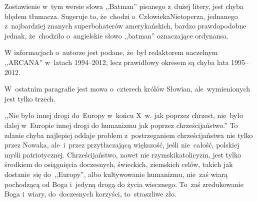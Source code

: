\documentclass[a4paper,11pt]{article}
\begin{document}
\start {} Zostawienie w~tym wersie słowa ,,Batman''
pisanego z~dużej litery, jest chyba błędem tłumacza. Sugeruje to,
że~chodzi o~Człowieka\dywiz Nietoperza, jednanego z~najbardziej
znanych superbohaterów amerykańskich, bardzo prawdopodobne jednak,
że~chodziło o~angielskie słowo ,,batman'' oznaczające ordynansa.


\vspace{\spaceTwo}








\start {} W informacjach o~autorze jest podane,
że~był redaktorem naczelnym ,,ARCANA'' w~latach 1994--2012, lecz
prawidłowy okresem są chyba lata 1995--2012.

\vspace{\spaceFour}


\start {} W~ostatnim paragrafie jest mowa o~czterech królów
Słowian, ale~wymienionych jest tylko trzech.

\vspace{\spaceFour}

\start {} ,,Nie było innej drogi do~Europy w~końcu X~w.
jak poprzez chrzest, nie~było dalej w~Europie innej drogi do humanizmu
jak poprzez chrześcijaństwo.'' To zdanie chyba najlepiej oddaje
problem z~postrzeganiem chrześcijaństwa nie tylko przez Nowaka,
ale~i~przez przytłaczającą większość, jeśli nie~całość, polskiej myśli
patriotycznej. Chrześcijaństwo, nawet nie rzymski\dywiz katolicyzm,
jest tylko środkiem do osiągnięcia doczesnych, świeckich, ziemskich
celów, takich jak dostanie~się do~,,Europy'', albo kultywowanie
humanizmu, nie~zaś wiarą pochodzącą od Boga i~jedyną drogą do życia
wiecznego. To~zaś zredukowanie Boga i~wiary, do~doczesnych korzyści,
to~straszliwe zło.
\end{document}
